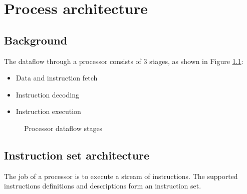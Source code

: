 \documentclass{report}
\begin{document}
\chapter{Process architecture}

\section{Background}

The dataflow through a processor consists of 3 stages, as shown in Figure
\ref{fig:processor-dataflow-stages}:

\begin{itemize}

\item Data and instruction fetch
\item Instruction decoding
\item Instruction execution

\end{itemize}

\begin {figure}[H]
\centering
{}
\caption {Processor dataflow stages}
\label {fig:processor-dataflow-stages}
\end {figure}



\section{Instruction set architecture}

The job of a processor is to execute a stream of instructions. The supported
instructions definitions and descriptions form an instruction set.


\end{document}
